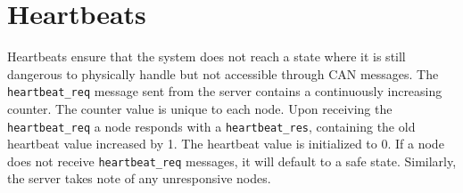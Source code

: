 \section{Heartbeats}\label{sec:heartbeats}
Heartbeats ensure that the system does not reach a state where it is still dangerous to physically handle but 
not accessible through CAN messages. The \texttt{heartbeat\_req} message sent from the server contains a continuously increasing counter.
The counter value is unique to each node. Upon receiving the \texttt{heartbeat\_req} a node responds with a \texttt{heartbeat\_res}, containing the old heartbeat value increased by 1. The heartbeat value is initialized to 0. If a node does not receive \texttt{heartbeat\_req} messages, it will default
to a safe state. Similarly, the server takes note of any unresponsive nodes.

